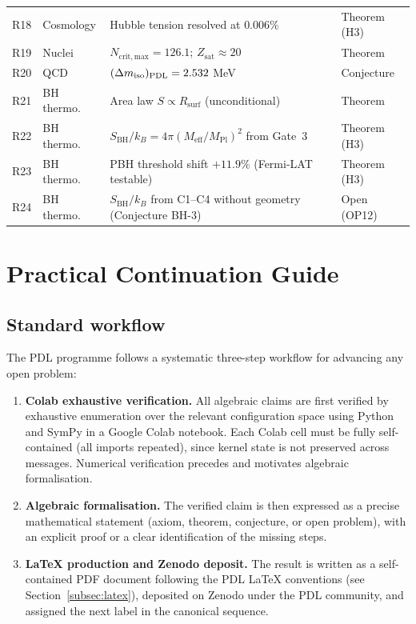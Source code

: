 \documentclass[11pt,a4paper]{article}
\theoremstyle{plain}
\theoremstyle{definition}
\theoremstyle{remark}
\newcommand{\PDL}{\textnormal{PDL}}
\newcommand{\Rsurf}{R_{\mathrm{surf}}}
\newcommand{\SBH}{S_{\mathrm{BH}}}
\newcommand{\Meff}{M_{\mathrm{eff}}}
\newcommand{\MPl}{M_{\mathrm{Pl}}}
\begin{document}
\begin{longtable}{@{}L{0.7cm}L{2.5cm}L{6.5cm}L{2.5cm}@{}}
R18 & Cosmology & Hubble tension resolved at $0.006\%$ & \textcolor{proofblue}{Theorem (H3)} \\[0.3em]
R19 & Nuclei & $N_{\mathrm{crit,max}}=126.1$; $Z_{\mathrm{sat}}\approx 20$ & \textcolor{proofblue}{Theorem} \\[0.3em]
R20 & QCD & $(\Delta m_{\mathrm{iso}})_{\PDL}=2.532$ MeV & \textcolor{conjecturegreen}{Conjecture} \\[0.3em]
R21 & BH thermo. & Area law $S\propto\Rsurf$ (unconditional) & \textcolor{proofblue}{Theorem} \\[0.3em]
R22 & BH thermo. & $\SBH/k_B=4\pi(\Meff/\MPl)^2$ from Gate~3 & \textcolor{proofblue}{Theorem (H3)} \\[0.3em]
R23 & BH thermo. & PBH threshold shift $+11.9\%$ (Fermi-LAT testable) & \textcolor{proofblue}{Theorem (H3)} \\[0.3em]
R24 & BH thermo. & $\SBH/k_B$ from C1--C4 without geometry (Conjecture BH-3) & \textcolor{openproblemred}{Open (OP12)} \\[0.3em]

\end{longtable}

\section{Practical Continuation Guide}
\label{sec:continuation}

\subsection{Standard workflow}
\label{subsec:workflow}

The PDL programme follows a systematic three-step workflow for advancing any open problem:
\begin{enumerate}
\item \textbf{Colab exhaustive verification.}
All algebraic claims are first verified by exhaustive enumeration over the relevant configuration space using Python and SymPy in a Google Colab notebook.
Each Colab cell must be fully self-contained (all imports repeated), since kernel state is not preserved across messages.
Numerical verification precedes and motivates algebraic formalisation.
\item \textbf{Algebraic formalisation.}
The verified claim is then expressed as a precise mathematical statement (axiom, theorem, conjecture, or open problem), with an explicit proof or a clear identification of the missing steps.
\item \textbf{LaTeX production and Zenodo deposit.}
The result is written as a self-contained PDF document following the PDL LaTeX conventions (see Section~\ref{subsec:latex}), deposited on Zenodo under the PDL community, and assigned the next label in the canonical sequence.
\end{enumerate}
\end{document}
